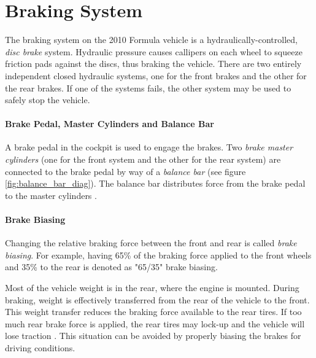 \section{Braking System}
\label{sec:brake-overview}

The braking system on the 2010 Formula vehicle is a hydraulically-controlled, \emph{disc brake} system. Hydraulic pressure causes callipers on each wheel to squeeze friction pads against the discs, thus braking the vehicle. There are two entirely independent closed hydraulic systems, one for the front brakes and the other for the rear brakes. If one of the systems fails, the other system may be used to safely stop the vehicle.

\paragraph{Brake Pedal, Master Cylinders and Balance Bar}

A brake pedal in the cockpit is used to engage the brakes. Two \emph{brake master cylinders} (one for the front system and the other for the rear system) are connected to the brake pedal by way of a \emph{balance bar} (see figure \ref{fig:balance_bar_diag}). The balance bar distributes force from the brake pedal to the master cylinders \cite{TiltonBrakeBias}. 

\paragraph{Brake Biasing}

Changing the relative braking force between the front and rear is called \emph{brake biasing}. For example, having 65\% of the braking force applied to the front wheels and 35\% to the rear is denoted as "65/35" brake biasing. 

Most of the vehicle weight is in the rear, where the engine is mounted. During braking, weight is effectively transferred from the rear of the vehicle to the front. This weight transfer reduces the braking force available to the rear tires. If too much rear brake force is applied, the rear tires may lock-up and the vehicle will lose traction \cite{FundVehicleDynamics}. This situation can be avoided by properly biasing the brakes for driving conditions.

